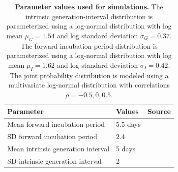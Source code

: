 \documentclass[12pt]{article}
\begin{document}
\begin{table}[!th]
\begin{center}
\begin{tabular}{|l|l|r|}
\hline
Parameter & Values & Source\\
\hline
Mean forward incubation period & 5.5 days & \cite{lauer2020incubation} \\
SD forward incubation period & 2.4 & \cite{lauer2020incubation} \\
Mean intrinsic generation interval & 5 days & \cite{ferretti2020quantifying} \\
SD intrinsic generation interval & 2 & \cite{ferretti2020quantifying} \\
\hline
\end{tabular}
\end{center}
\caption{
\textbf{Parameter values used for simulations.}
The intrinsic generation-interval distribution is parameterized using a log-normal distribution with log mean $\mu_G=1.54$ and log standard deviation $\sigma_G=0.37$.
The forward incubation period distribution is parameterized using a log-normal distribution with log mean $\mu_I=1.62$ and log standard deviation $\sigma_I=0.42$.
The joint probability distribution is modeled using a multivariate log-normal distribution with correlations $\rho=-0.5, 0, 0.5$.
}
\end{table}
\end{document}
